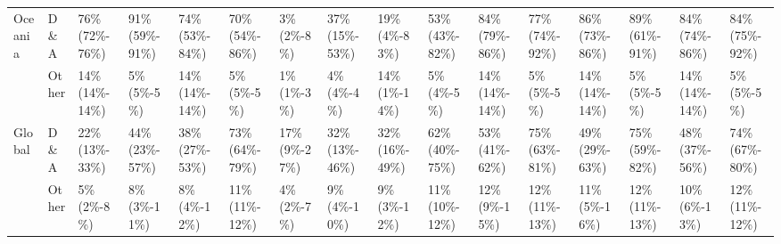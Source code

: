 \begin{tabular}{ll p{1cm} p{1cm} p{1cm} p{1cm} p{1cm} p{1cm} p{1cm} p{1cm} p{1cm} p{1cm} p{1cm} p{1cm} p{1cm} p{1cm}}
Oceania & D\&A &              76\% \mbox{(72\%-76\%)} &  91\% \mbox{(59\%-91\%)} &          74\% \mbox{(53\%-84\%)} &  70\% \mbox{(54\%-86\%)} &           3\% \mbox{(2\%-8\%)} &  37\% \mbox{(15\%-53\%)} &                  19\% \mbox{(4\%-83\%)} &  53\% \mbox{(43\%-82\%)} &       84\% \mbox{(79\%-86\%)} &  77\% \mbox{(74\%-92\%)} &  86\% \mbox{(73\%-86\%)} &  89\% \mbox{(61\%-91\%)} &  84\% \mbox{(74\%-86\%)} &  84\% \mbox{(75\%-92\%)} \\
       & Other &              14\% \mbox{(14\%-14\%)} &     5\% \mbox{(5\%-5\%)} &          14\% \mbox{(14\%-14\%)} &     5\% \mbox{(5\%-5\%)} &           1\% \mbox{(1\%-3\%)} &     4\% \mbox{(4\%-4\%)} &                  14\% \mbox{(1\%-14\%)} &     5\% \mbox{(4\%-5\%)} &       14\% \mbox{(14\%-14\%)} &     5\% \mbox{(5\%-5\%)} &  14\% \mbox{(14\%-14\%)} &     5\% \mbox{(5\%-5\%)} &  14\% \mbox{(14\%-14\%)} &     5\% \mbox{(5\%-5\%)} \\
Global & D\&A &              22\% \mbox{(13\%-33\%)} &  44\% \mbox{(23\%-57\%)} &          38\% \mbox{(27\%-53\%)} &  73\% \mbox{(64\%-79\%)} &         17\% \mbox{(9\%-27\%)} &  32\% \mbox{(13\%-46\%)} &                 32\% \mbox{(16\%-49\%)} &  62\% \mbox{(40\%-75\%)} &       53\% \mbox{(41\%-62\%)} &  75\% \mbox{(63\%-81\%)} &  49\% \mbox{(29\%-63\%)} &  75\% \mbox{(59\%-82\%)} &  48\% \mbox{(37\%-56\%)} &  74\% \mbox{(67\%-80\%)} \\
       & Other &                 5\% \mbox{(2\%-8\%)} &    8\% \mbox{(3\%-11\%)} &            8\% \mbox{(4\%-12\%)} &  11\% \mbox{(11\%-12\%)} &           4\% \mbox{(2\%-7\%)} &    9\% \mbox{(4\%-10\%)} &                   9\% \mbox{(3\%-12\%)} &  11\% \mbox{(10\%-12\%)} &        12\% \mbox{(9\%-15\%)} &  12\% \mbox{(11\%-13\%)} &   11\% \mbox{(5\%-16\%)} &  12\% \mbox{(11\%-13\%)} &   10\% \mbox{(6\%-13\%)} &  12\% \mbox{(11\%-12\%)} \\
\bottomrule
\end{tabular}
